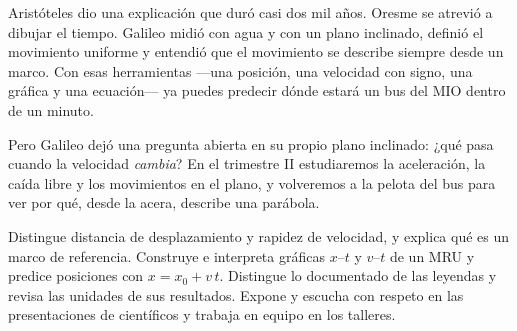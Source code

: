 \documentclass[11pt]{article}
\begin{document}

Aristóteles dio una explicación que duró casi dos mil años. Oresme se atrevió a dibujar el
tiempo. Galileo midió con agua y con un plano inclinado, definió el movimiento uniforme y
entendió que el movimiento se describe siempre desde un marco. Con esas herramientas ---una
posición, una velocidad con signo, una gráfica y una ecuación--- ya puedes predecir dónde
estará un bus del MIO dentro de un minuto.

Pero Galileo dejó una pregunta abierta en su propio plano inclinado: ¿qué pasa cuando la
velocidad \emph{cambia}? En el trimestre II estudiaremos la aceleración, la caída libre y los
movimientos en el plano, y volveremos a la pelota del bus para ver por qué, desde la acera,
describe una parábola.

\matrizevaluacion
  {Distingue distancia de desplazamiento y rapidez de velocidad, y explica qué es un marco de referencia.}
  {Construye e interpreta gráficas $x$--$t$ y $v$--$t$ de un MRU y predice posiciones con $x = x_0 + v\,t$.}
  {Distingue lo documentado de las leyendas y revisa las unidades de sus resultados.}
  {Expone y escucha con respeto en las presentaciones de científicos y trabaja en equipo en los talleres.}

\autoevaluacion

\seguimientodocente
\end{document}
